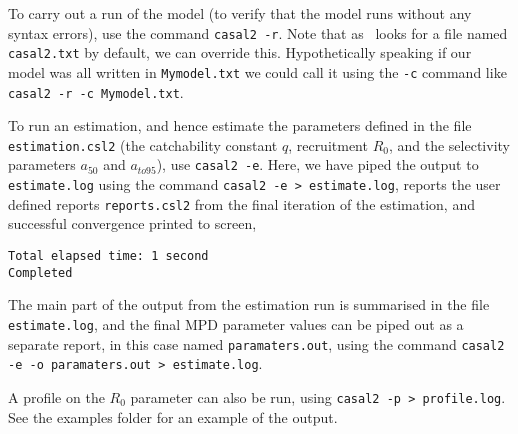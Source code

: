 To carry out a run of the model (to verify that the model runs without any syntax errors), use the command \texttt{casal2 -r}. Note that as \CNAME\ looks for a file named \texttt{casal2.txt} by default, we can override this. Hypothetically speaking if our model was all written in \texttt{Mymodel.txt} we could call it using the \texttt{-c} command like \texttt{casal2 -r -c Mymodel.txt}.

To run an estimation, and hence estimate the parameters defined in the file \texttt{estimation.csl2} (the catchability constant $q$, recruitment $R_0$, and the selectivity parameters $a_{50}$ and $a_{to95}$), use  \texttt{casal2 -e}. Here, we have piped the output to \texttt{estimate.log} using the command \texttt{casal2 -e > estimate.log}, reports the user defined reports \texttt{reports.csl2} from the final iteration of the estimation, and successful convergence printed to screen,
{\small{\begin{verbatim}
Total elapsed time: 1 second
Completed
\end{verbatim}}}

The main part of the output from the estimation run is summarised in the file \texttt{estimate.log}, and the final MPD parameter values can be piped out as a separate report, in this case named \texttt{paramaters.out}, using the command \texttt{casal2 -e -o paramaters.out > estimate.log}.

A profile on the $R_0$ parameter can also be run, using \texttt{casal2 -p > profile.log}. See the examples folder for an example of the output.

